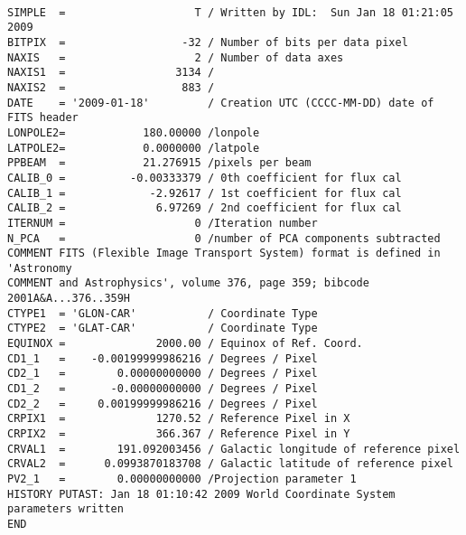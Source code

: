 \documentclass{emulateapj}
\begin{document}
\begin{verbatim}

SIMPLE  =                    T / Written by IDL:  Sun Jan 18 01:21:05 2009      
BITPIX  =                  -32 / Number of bits per data pixel                  
NAXIS   =                    2 / Number of data axes                            
NAXIS1  =                 3134 /                                                
NAXIS2  =                  883 /                                                
DATE    = '2009-01-18'         / Creation UTC (CCCC-MM-DD) date of FITS header  
LONPOLE2=            180.00000 /lonpole                                         
LATPOLE2=            0.0000000 /latpole                                         
PPBEAM  =            21.276915 /pixels per beam                                 
CALIB_0 =          -0.00333379 / 0th coefficient for flux cal                   
CALIB_1 =             -2.92617 / 1st coefficient for flux cal                   
CALIB_2 =              6.97269 / 2nd coefficient for flux cal                   
ITERNUM =                    0 /Iteration number                                
N_PCA   =                    0 /number of PCA components subtracted             
COMMENT FITS (Flexible Image Transport System) format is defined in 'Astronomy  
COMMENT and Astrophysics', volume 376, page 359; bibcode 2001A&A...376..359H    
CTYPE1  = 'GLON-CAR'           / Coordinate Type                                
CTYPE2  = 'GLAT-CAR'           / Coordinate Type                                
EQUINOX =              2000.00 / Equinox of Ref. Coord.                         
CD1_1   =    -0.00199999986216 / Degrees / Pixel                                
CD2_1   =        0.00000000000 / Degrees / Pixel                                
CD1_2   =       -0.00000000000 / Degrees / Pixel                                
CD2_2   =     0.00199999986216 / Degrees / Pixel                                
CRPIX1  =              1270.52 / Reference Pixel in X                           
CRPIX2  =              366.367 / Reference Pixel in Y                           
CRVAL1  =        191.092003456 / Galactic longitude of reference pixel          
CRVAL2  =      0.0993870183708 / Galactic latitude of reference pixel           
PV2_1   =        0.00000000000 /Projection parameter 1                          
HISTORY PUTAST: Jan 18 01:10:42 2009 World Coordinate System parameters written 
END                                                                             

\end{verbatim}






\end{document}
